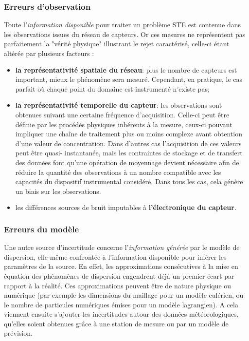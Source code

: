 \subsubsection{Erreurs d'observation}
Toute l'\textit{information disponible} pour traiter un problème STE est {contenue} dans les observations issues du réseau de capteurs. Or ces mesures ne représentent pas parfaitement la "vérité physique" illustrant le rejet caractérisé, celle-ci étant altérée par plusieurs facteurs : \\

\begin{itemize}
	\item \textbf{la représentativité spatiale du réseau}: plus le nombre de capteurs est important, mieux le phénomène sera mesuré. Cependant, en pratique, le cas parfait où chaque point du domaine est instrumenté n'existe pas;
	\item \textbf{la représentativité temporelle du capteur}: les observations sont obtenues suivant une certaine fréquence d'acquisition. Celle-ci peut être définie par les procédés physiques inhérents à la mesure, ceux-ci pouvant impliquer une chaîne de traitement plus ou moins complexe avant obtention d'une valeur de concentration. Dans d'autres cas l'acquisition de ces valeurs peut être quasi- instantanée, mais les contraintes de stockage et de transfert des données font qu'une opération de moyennage devient nécessaire afin de réduire la quantité des observations à un nombre compatible avec les capacités du dispositif instrumental considéré. Dans tous les cas, cela génère un biais sur les observations.
	\item les différences sources de bruit imputables à \textbf{l'électronique du capteur}.\\
\end{itemize}

\subsubsection{Erreurs du modèle}
Une autre source d'incertitude concerne l'\textit{information générée} par le modèle de dispersion, elle-même confrontée à l'information disponible pour inférer les paramètres de la source. En effet, les approximations consécutives à la mise en équation des phénomènes de dispersion engendrent déjà un premier écart par rapport à la réalité. Ces approximations peuvent être de nature physique ou numérique (par exemple les dimensions du maillage pour un modèle eulérien, ou le nombre de particules numériques émises pour un modèle lagrangien). A cela viennent ensuite s'ajouter les incertitudes autour des données météorologiques, qu'elles soient obtenues grâce à une station de mesure ou par un modèle de prévision. \\


